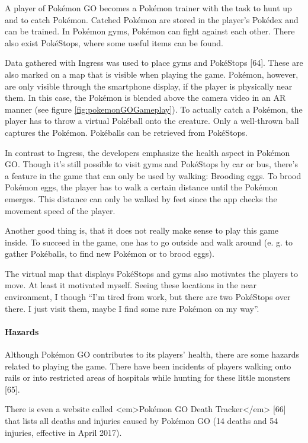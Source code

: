 A player of Pokémon GO becomes a Pokémon trainer with the task to hunt up and to catch Pokémon. Catched Pokémon are stored in the player’s Pokédex and can be trained. In Pokémon gyms, Pokémon can fight against each other. There also exist PokéStops, where some useful items can be found.

Data gathered with Ingress was used to place gyms and PokéStops [64]. These are also marked on a map that is visible when playing the game. Pokémon, however, are only visible through the smartphone display, if the player is physically near them. In this case, the Pokémon is blended above the camera video in an AR manner (see figure \ref{fig:pokemonGOGameplay}).
To actually catch a Pokémon, the player has to throw a virtual Pokéball onto the creature. Only a well-thrown ball captures the Pokémon. Pokéballs can be retrieved from PokéStops.

In contrast to Ingress, the developers emphasize the health aspect in Pokémon GO. Though it’s still possible to visit gyms and PokéStops by car or bus, there’s a feature in the game that can only be used by walking: Brooding eggs. To brood Pokémon eggs, the player has to walk a certain distance until the Pokémon emerges. This distance can only be walked by feet since the app checks the movement speed of the player.

Another good thing is, that it does not really make sense to play this game inside. To succeed in the game, one has to go outside and walk around (e. g. to gather Pokéballs, to find new Pokémon or to brood eggs).

The virtual map that displays PokéStops and gyms also motivates the players to move. At least it motivated myself. Seeing these locations in the near environment, I though “I’m tired from work, but there are two PokéStops over there. I just visit them, maybe I find some rare Pokémon on my way”.

\paragraph{Hazards}
Although Pokémon GO contributes to its players’ health, there are some hazards related to playing the game. There have been incidents of players walking onto rails or into restricted areas of hospitals while hunting for these little monsters [65].

There is even a website called <em>Pokémon GO Death Tracker</em> [66] that lists all deaths and injuries caused by Pokémon GO (14 deaths and 54 injuries, effective in April 2017).

